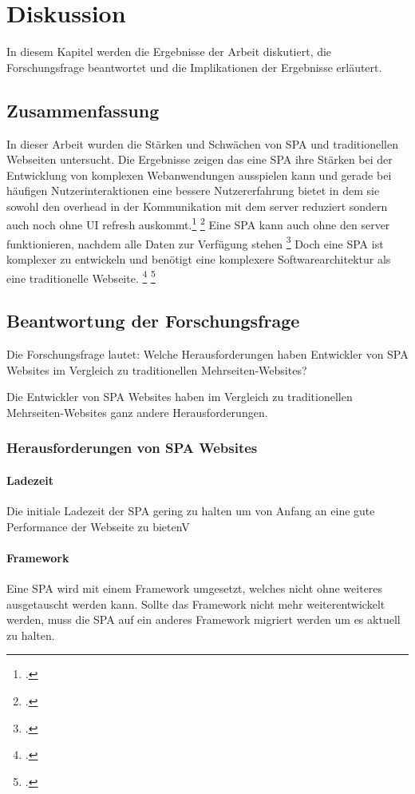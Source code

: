 \section{Diskussion}
In diesem Kapitel werden die Ergebnisse der Arbeit diskutiert, die Forschungsfrage beantwortet und die Implikationen der Ergebnisse erläutert.

\subsection{Zusammenfassung}
In dieser Arbeit wurden die Stärken und Schwächen von \ac{SPA} und traditionellen Webseiten untersucht.
Die Ergebnisse zeigen das eine \ac{SPA} ihre Stärken bei der Entwicklung von komplexen Webanwendungen ausspielen kann und
gerade bei häufigen Nutzerinteraktionen eine bessere Nutzererfahrung bietet in dem sie sowohl den \gls{overhead} in der Kommunikation mit dem \gls{server} reduziert sondern auch noch ohne \ac{UI} refresh auskommt.\footcite[Vgl.][Seite 5]{Solovei2018} \footcite[Vgl.][Seite 143]{Irudayaraj2019}
Eine \ac{SPA} kann auch ohne den \gls{server} funktionieren, nachdem alle Daten zur Verfügung stehen \footcite[Vgl.][Seite 6]{Solovei2018}
Doch eine \ac{SPA} ist komplexer zu entwickeln und benötigt eine komplexere Softwarearchitektur als eine traditionelle Webseite. \footcite[Vgl.][Seite 4]{Smith2022} \footcite[Vgl.][Seite 15]{Flanagan2011}


\subsection{Beantwortung der Forschungsfrage}
Die Forschungsfrage lautet: Welche Herausforderungen haben Entwickler von \ac{SPA} Websites im Vergleich zu traditionellen Mehrseiten-Websites?

Die Entwickler von \ac{SPA} Websites haben im Vergleich zu traditionellen Mehrseiten-Websites ganz andere Herausforderungen.
\subsubsection{Herausforderungen von \ac{SPA} Websites}
\paragraph*{Ladezeit}
Die initiale Ladezeit der \ac{SPA} gering zu halten um von Anfang an eine gute Performance der Webseite zu bietenV
\paragraph*{Framework}
Eine \ac{SPA} wird mit einem Framework umgesetzt, welches nicht ohne weiteres ausgetauscht werden kann. Sollte das
Framework nicht mehr weiterentwickelt werden, muss die \ac{SPA} auf ein anderes Framework migriert werden um es aktuell zu halten.
